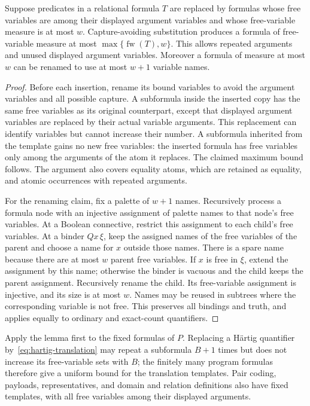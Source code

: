 \begin{lemma}\label{lem:substitution-width}
Suppose predicates in a relational formula $T$ are replaced by formulas
whose free variables are among their displayed argument variables and
whose free-variable measure is at most $w$. Capture-avoiding substitution
produces a formula of free-variable measure at most
$\max\{\operatorname{fw}(T),w\}$. This allows repeated arguments and
unused displayed argument variables. Moreover a formula of measure at
most $w$ can be renamed to use at most $w+1$ variable names.
\end{lemma}
\begin{proof}
Before each insertion, rename its bound variables to avoid the argument
variables and all possible capture. A subformula inside the inserted
copy has the same free variables as its original counterpart, except
that displayed argument variables are replaced by their actual variable
arguments. This replacement can identify variables but cannot increase
their number. A subformula inherited from the template gains no new
free variables: the inserted formula has free variables only among the
arguments of the atom it replaces. The claimed maximum bound follows.
The argument also covers equality atoms, which are retained as equality,
and atomic occurrences with repeated arguments.

For the renaming claim, fix a palette of $w+1$ names. Recursively process
a formula node with an injective assignment of palette names to that
node's free variables. At a Boolean connective, restrict this assignment
to each child's free variables. At a binder $Qx\,\xi$, keep the assigned
names of the free variables of the parent and choose a name for $x$
outside those names. There is a spare name because there are at most
$w$ parent free variables. If $x$ is free in $\xi$, extend the assignment
by this name; otherwise the binder is vacuous and the child keeps the
parent assignment. Recursively rename the child. Its free-variable
assignment is injective, and its size is at most $w$. Names may be reused
in subtrees where the corresponding variable is not free. This preserves
all bindings and truth, and applies equally to ordinary and exact-count
quantifiers.
\end{proof}

Apply the lemma first to the fixed formulas of $P$. Replacing a
H\"artig quantifier by~\eqref{eq:hartig-translation} may repeat a
subformula $B+1$ times but does not increase its free-variable sets with
$B$; the finitely many program formulas therefore give a uniform bound
for the translation templates. Pair coding, payloads, representatives,
and domain and relation definitions also have fixed templates, with all
free variables among their displayed arguments.

